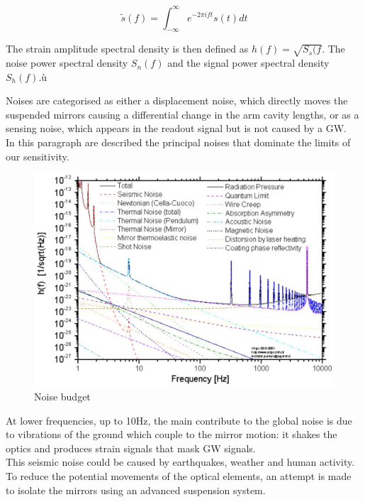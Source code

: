 \documentclass[binding=0.6cm, LaM]{sapthesis}
\begin{document}
		\begin{equation}
                \tilde s(f) = \int^{\infty}_{-\infty} e^{-2 \pi ift} s(t)dt
		\end{equation}

	The strain amplitude spectral density is then defined as $h(f) = \sqrt{S_s(f}$.
	The noise power spectral density $S_n(f)$ and the signal power spectral density $S_h(f)$.ù
  
	Noises are categorised as either a displacement noise, which directly moves the suspended mirrors
        causing a differential change in the arm cavity lengths, or as a sensing noise,
        which appears in the readout signal but is not caused by a GW. \\
        In this paragraph are described the principal noises that dominate the limits of our sensitivity.

                \begin{figure}
                        \includegraphics[scale=0.3]{noisetwo}
                        \centering
                        \caption{Noise budget}
                        \label{fig:noisetwo}
                \end{figure}

        At lower frequencies, up to 10Hz, the main contribute to the global noise
        is due to vibrations of the ground which couple to the mirror motion: it shakes the optics and produces strain signals that mask GW signals. \\
        This seismic noise could be caused by earthquakes, weather and human activity.
        To reduce the potential movements of the optical elements, an attempt is made to
        isolate the mirrors using an advanced suspension system. \\
\end{document}
